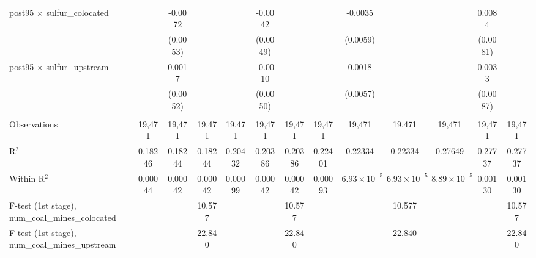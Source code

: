 \begin{table}[htbp]
\begin{adjustbox}{width = \textwidth, center}
\begin{tabular}{lcccccccccccc}
         post95 $\times$ sulfur\_colocated                  &                & -0.0072       &               &                & -0.0042       &               &               & -0.0035               &                       &                       & 0.0084        &   \\   
                                                            &                & (0.0053)      &               &                & (0.0049)      &               &               & (0.0059)              &                       &                       & (0.0081)      &   \\   
         post95 $\times$ sulfur\_upstream                   &                & 0.0017        &               &                & -0.0010       &               &               & 0.0018                &                       &                       & 0.0033        &   \\   
                                                            &                & (0.0052)      &               &                & (0.0050)      &               &               & (0.0057)              &                       &                       & (0.0087)      &   \\   
          \\
         Observations                                       & 19,471         & 19,471        & 19,471        & 19,471         & 19,471        & 19,471        & 19,471        & 19,471                & 19,471                & 19,471                & 19,471        & 19,471\\  
         R$^2$                                              & 0.18246        & 0.18244       & 0.18244       & 0.20432        & 0.20386       & 0.20386       & 0.22401       & 0.22334               & 0.22334               & 0.27649               & 0.27737       & 0.27737\\  
         Within R$^2$                                       & 0.00044        & 0.00042       & 0.00042       & 0.00099        & 0.00042       & 0.00042       & 0.00093       & $6.93\times 10^{-5}$  & $6.93\times 10^{-5}$  & $8.89\times 10^{-5}$  & 0.00130       & 0.00130\\  
         F-test (1st stage), num\_coal\_mines\_colocated    &                &               & 10.577        &                &               & 10.577        &               &                       & 10.577                &                       &               & 10.577\\  
         F-test (1st stage), num\_coal\_mines\_upstream     &                &               & 22.840        &                &               & 22.840        &               &                       & 22.840                &                       &               & 22.840\\  

\end{tabular}
\end{adjustbox}
\end{table}
